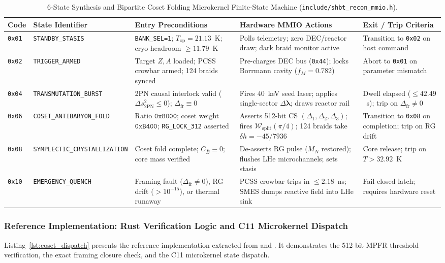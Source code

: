 \documentclass[11pt,onecolumn]{article}
\begin{document}
\begin{table}[!htbp]
\centering\scriptsize
\caption[6-State Synthesis and Bipartite Coset Folding FSM]{6-State Synthesis and Bipartite Coset Folding Microkernel Finite-State Machine (\texttt{include/shbt\_recon\_mmio.h}).}
\label{tab:synth_fsm}
\begin{tabularx}{\textwidth}{@{}l l p{3.2cm} p{4.2cm} >{\raggedright\arraybackslash}X@{}}
\toprule
Code & State Identifier & Entry Preconditions & Hardware MMIO Actions & Exit / Trip Criteria \\
\midrule
\texttt{0x01} & \texttt{STANDBY\_STASIS} & \texttt{BANK\_SEL=1}; $T_{\text{op}} = 21.13$~K; cryo headroom $\ge 11.79$~K & Polls telemetry; zero DEC/reactor draw; dark braid monitor active & Transition to \texttt{0x02} on host command \\
\texttt{0x02} & \texttt{TRIGGER\_ARMED} & Target $Z, A$ loaded; PCSS crowbar armed; 124 braids synced & Pre-charges DEC bus (\texttt{0x44}); locks Borrmann cavity ($f_M = 0.782$) & Abort to \texttt{0x01} on parameter mismatch \\
\texttt{0x04} & \texttt{TRANSMUTATION\_BURST} & 2PN causal interlock valid ($\Delta s^2_{\text{2PN}} \le 0$); $\Delta_{\text{fr}} \equiv 0$ & Fires $40$~keV seed laser; applies single-sector $\Delta\bm{\lambda}$; draws reactor rail & Dwell elapsed ($\le 42.49$~s); trip on $\Delta_{\text{fr}} \neq 0$ \\
\texttt{0x06} & \texttt{COSET\_ANTIBARYON\_FOLD} & Ratio $\texttt{0x8000}$; coset weight $\texttt{0xB400}$; \texttt{RG\_LOCK\_312} asserted & Asserts 512-bit CS $(\Delta_1, \Delta_2, \Delta_3)$; fires $\mathcal{W}_{\text{split}}(\pi/4)$; 124 braids take $\delta h = -45/7936$ & Transition to \texttt{0x08} on completion; trip on RG drift \\
\texttt{0x08} & \texttt{SYMPLECTIC\_CRYSTALLIZATION} & Coset fold complete; $C_{\bar{B}} \equiv 0$; core mass verified & De-asserts RG pulse ($M_N$ restored); flushes LHe microchannels; sets stasis & Core release; trip on $T > 32.92$~K \\
\texttt{0x10} & \texttt{EMERGENCY\_QUENCH} & Framing fault ($\Delta_{\text{fr}} \neq 0$), RG drift ($> 10^{-15}$), or thermal runaway & PCSS crowbar trips in $\le 2.18$~ns; SMES dumps reactive field into LHe sink & Fail-closed latch; requires hardware reset \\
\bottomrule
\end{tabularx}
\end{table}

\subsubsection{Reference Implementation: Rust Verification Logic and C11 Microkernel Dispatch}
Listing~\ref{lst:coset_dispatch} presents the reference implementation extracted from  and . It demonstrates the 512-bit MPFR threshold verification, the exact framing closure check, and the C11 microkernel state dispatch.
\end{document}
